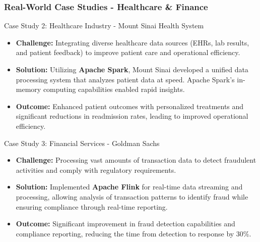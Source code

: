 \documentclass[aspectratio=169]{beamer}
\begin{document}
\begin{frame}[fragile]
    \frametitle{Real-World Case Studies - Healthcare & Finance}
    \begin{block}{Case Study 2: Healthcare Industry - Mount Sinai Health System}
        \begin{itemize}
            \item \textbf{Challenge:} Integrating diverse healthcare data sources (EHRs, lab results, and patient feedback) to improve patient care and operational efficiency.
            \item \textbf{Solution:} 
            Utilizing \textbf{Apache Spark}, Mount Sinai developed a unified data processing system that analyzes patient data at speed. Apache Spark's in-memory computing capabilities enabled rapid insights.
            \item \textbf{Outcome:} Enhanced patient outcomes with personalized treatments and significant reductions in readmission rates, leading to improved operational efficiency.
        \end{itemize}
    \end{block}

    \begin{block}{Case Study 3: Financial Services - Goldman Sachs}
        \begin{itemize}
            \item \textbf{Challenge:} Processing vast amounts of transaction data to detect fraudulent activities and comply with regulatory requirements.
            \item \textbf{Solution:} 
            Implemented \textbf{Apache Flink} for real-time data streaming and processing, allowing analysis of transaction patterns to identify fraud while ensuring compliance through real-time reporting.
            \item \textbf{Outcome:} Significant improvement in fraud detection capabilities and compliance reporting, reducing the time from detection to response by 30\%.
        \end{itemize}
    \end{block}
\end{frame}
\end{document}
